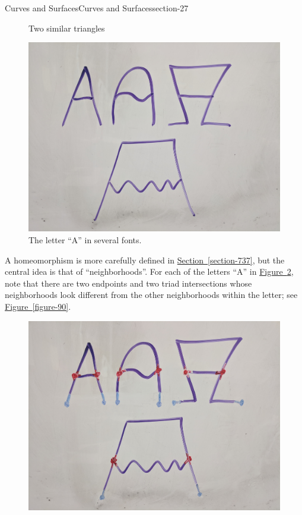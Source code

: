 \documentclass[oneside,10pt,]{article}
\begin{document}
\begin{sectionptx}{Curves and Surfaces}{}{Curves and Surfaces}{}{}{section-27}
\begin{figure}
\caption{Two similar triangles\label{figure-77}}
\end{figure}
\begin{figure}
\centering
\includegraphics[width=1\linewidth]{images/letter-a.jpg}
\caption{The letter ``A'' in several fonts.\label{figure-80}}
\end{figure}
\hypertarget{p-84}{}%
A homeomorphism is more carefully defined in \hyperref[section-737]{Section~\ref{section-737}}, but the central idea is that of ``neighborhoods''. For each of the letters ``A'' in \hyperref[figure-80]{Figure~\ref{figure-80}}, note that there are two endpoints and two triad intersections whose neighborhoods look different from the other neighborhoods within the letter; see \hyperref[figure-90]{Figure~\ref{figure-90}}.%
\begin{figure}
\centering
\includegraphics[width=1\linewidth]{images/letter-a-neighborhoods.jpg}

\end{figure}
\end{sectionptx}
\end{document}
